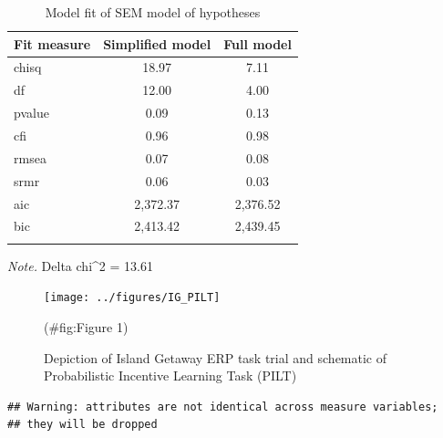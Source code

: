 \documentclass[english,man,floatsintext]{apa6}
\begin{document}
\begin{table}[tbp]

\begin{center}
\begin{threeparttable}

\caption{\label{tab:unnamed-chunk-7}Model fit of SEM model of hypotheses}

\begin{tabular}{lcc}
\toprule
Fit measure & Simplified model & Full model\\
\midrule
chisq & 18.97 & 7.11\\
df & 12.00 & 4.00\\
pvalue & 0.09 & 0.13\\
cfi & 0.96 & 0.98\\
rmsea & 0.07 & 0.08\\
srmr & 0.06 & 0.03\\
aic & 2,372.37 & 2,376.52\\
bic & 2,413.42 & 2,439.45\\
\bottomrule
\addlinespace
\end{tabular}

\begin{tablenotes}[para]
\normalsize{\textit{Note.} Delta chi\textasciicircum{}2 = 13.61}
\end{tablenotes}

\end{threeparttable}
\end{center}

\end{table}

\begin{figure}
\texttt{[image: ../figures/IG\_PILT]} \caption{Depiction of Island Getaway ERP task trial and schematic of Probabilistic Incentive Learning Task (PILT)}(\#fig:Figure 1)
\end{figure}

\begin{verbatim}
## Warning: attributes are not identical across measure variables;
## they will be dropped
\end{verbatim}
\end{document}
